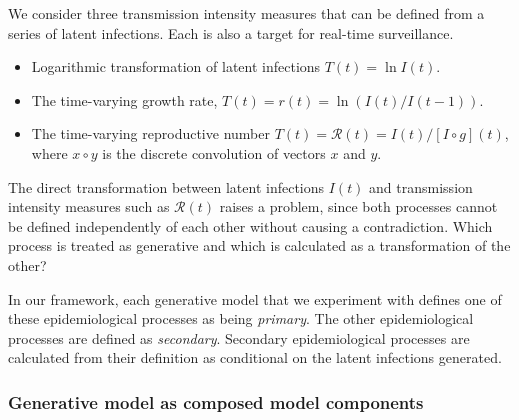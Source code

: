 \documentclass{getwriting}
\begin{document}
We consider three transmission intensity measures that can be defined from a series of latent infections. Each is also a target for real-time surveillance.

\begin{itemize}
    \item Logarithmic transformation of latent infections $T(t) = \ln I(t)$.
    \item The time-varying growth rate, $T(t) = r(t) = \ln (I(t) / I(t-1))$.
    \item The time-varying reproductive number $T(t) = \mathcal{R}(t) = I(t) / [I \circ g](t)$, where $x\circ y$ is the discrete convolution of vectors $x$ and $y$.
\end{itemize}

The direct transformation between latent infections $I(t)$ and transmission intensity measures such as $\mathcal{R}(t)$ raises a problem, since both processes cannot be defined independently of each other without causing a contradiction. Which process is treated as generative and which is calculated as a transformation of the other?

In our framework, each generative model that we experiment with defines one of these epidemiological processes as being \textit{primary}. The other epidemiological processes are defined as \textit{secondary}. Secondary epidemiological processes are calculated from their definition as conditional on the latent infections generated.

\subsubsection{Generative model as composed model components}
\end{document}
